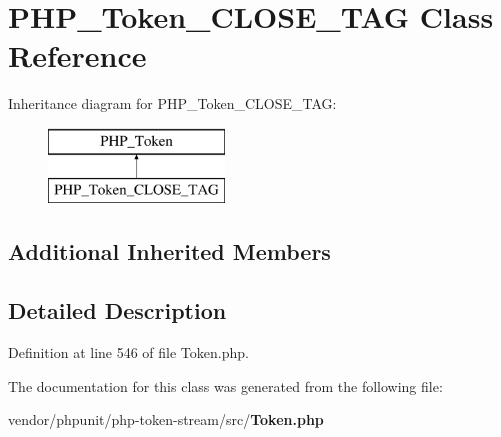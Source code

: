 \section{P\+H\+P\+\_\+\+Token\+\_\+\+C\+L\+O\+S\+E\+\_\+\+T\+A\+G Class Reference}
\label{class_p_h_p___token___c_l_o_s_e___t_a_g}
Inheritance diagram for P\+H\+P\+\_\+\+Token\+\_\+\+C\+L\+O\+S\+E\+\_\+\+T\+A\+G\+:\begin{figure}[H]
\begin{center}
\leavevmode
\includegraphics[height=2.000000cm]{class_p_h_p___token___c_l_o_s_e___t_a_g}
\end{center}
\end{figure}
\subsection*{Additional Inherited Members}


\subsection{Detailed Description}


Definition at line 546 of file Token.\+php.



The documentation for this class was generated from the following file\+:\begin{DoxyCompactItemize}
\item 
vendor/phpunit/php-\/token-\/stream/src/{\bf Token.\+php}\end{DoxyCompactItemize}
